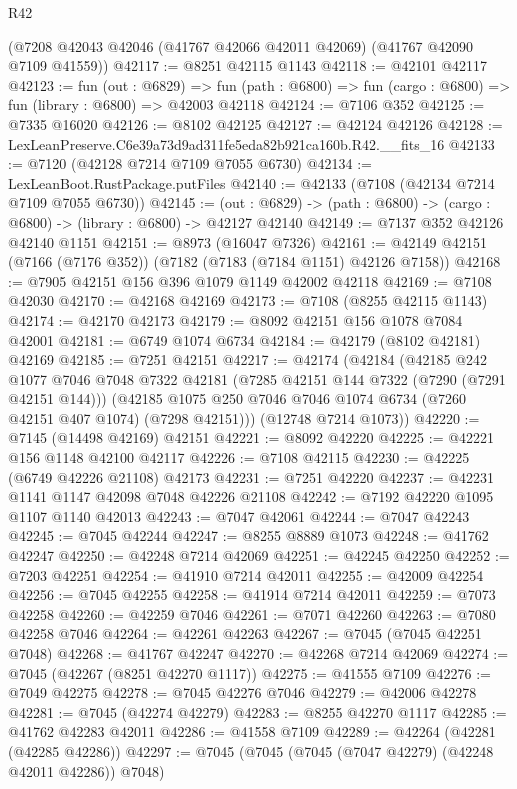 \begin{lexlean}{R42}
\begin{coremodule}
{    (@7208 @42043 @42046 (@41767 @42066 @42011 @42069) (@41767 @42090 @7109 @41559))
@42117 := @8251 @42115 @1143
@42118 := @42101 @42117
@42123 := fun (out : @6829) =>
  fun (path : @6800) => fun (cargo : @6800) => fun (library : @6800) => @42003 @42118
@42124 := @7106 @352
@42125 := @7335 @16020
@42126 := @8102 @42125
@42127 := @42124 @42126
@42128 := LexLeanPreserve.C6e39a73d9ad311fe5eda82b921ca160b.R42.__fits_16
@42133 := @7120 (@42128 @7214 @7109 @7055 @6730)
@42134 := LexLeanBoot.RustPackage.putFiles
@42140 := @42133 (@7108 (@42134 @7214 @7109 @7055 @6730))
@42145 := (out : @6829) -> (path : @6800) -> (cargo : @6800) -> (library : @6800) -> @42127 @42140
@42149 := @7137 @352 @42126 @42140 @1151
@42151 := @8973 (@16047 @7326)
@42161 := @42149 @42151 (@7166 (@7176 @352)) (@7182 (@7183 (@7184 @1151) @42126 @7158))
@42168 := @7905 @42151 @156 @396 @1079 @1149 @42002 @42118
@42169 := @7108 @42030
@42170 := @42168 @42169
@42173 := @7108 (@8255 @42115 @1143)
@42174 := @42170 @42173
@42179 := @8092 @42151 @156 @1078 @7084 @42001
@42181 := @6749 @1074 @6734
@42184 := @42179 (@8102 @42181) @42169
@42185 := @7251 @42151
@42217 := @42174
    (@42184
      (@42185
        @242
        @1077
        @7046
        @7048
        @7322
        @42181
        (@7285 @42151 @144 @7322 (@7290 (@7291 @42151 @144)))
        (@42185 @1075 @250 @7046 @7046 @1074 @6734 (@7260 @42151 @407 @1074) (@7298 @42151)))
      (@12748 @7214 @1073))
@42220 := @7145 (@14498 @42169) @42151
@42221 := @8092 @42220
@42225 := @42221 @156 @1148 @42100 @42117
@42226 := @7108 @42115
@42230 := @42225 (@6749 @42226 @21108) @42173
@42231 := @7251 @42220
@42237 := @42231 @1141 @1147 @42098 @7048 @42226 @21108
@42242 := @7192 @42220 @1095 @1107 @1140 @42013
@42243 := @7047 @42061
@42244 := @7047 @42243
@42245 := @7045 @42244
@42247 := @8255 @8889 @1073
@42248 := @41762 @42247
@42250 := @42248 @7214 @42069
@42251 := @42245 @42250
@42252 := @7203 @42251
@42254 := @41910 @7214 @42011
@42255 := @42009 @42254
@42256 := @7045 @42255
@42258 := @41914 @7214 @42011
@42259 := @7073 @42258
@42260 := @42259 @7046
@42261 := @7071 @42260
@42263 := @7080 @42258 @7046
@42264 := @42261 @42263
@42267 := @7045 (@7045 @42251 @7048)
@42268 := @41767 @42247
@42270 := @42268 @7214 @42069
@42274 := @7045 (@42267 (@8251 @42270 @1117))
@42275 := @41555 @7109
@42276 := @7049 @42275
@42278 := @7045 @42276 @7046
@42279 := @42006 @42278
@42281 := @7045 (@42274 @42279)
@42283 := @8255 @42270 @1117
@42285 := @41762 @42283 @42011
@42286 := @41558 @7109
@42289 := @42264 (@42281 (@42285 @42286))
@42297 := @7045 (@7045 (@7045 (@7047 @42279) (@42248 @42011 @42286)) @7048)
}
\end{coremodule}
\end{lexlean}
